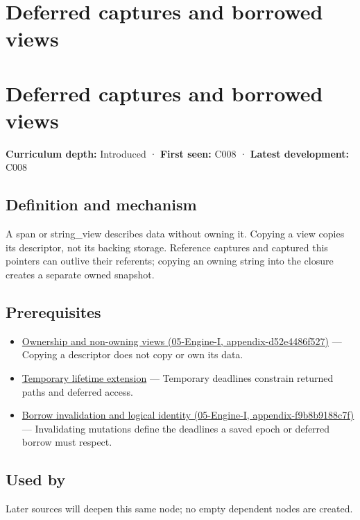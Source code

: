 \hypertarget{appendix-aea529eb5175}{}
\section*{Deferred captures and borrowed views}
\section{Deferred captures and borrowed views}\label{deferred-captures-and-borrowed-views}

\textbf{Curriculum depth:} Introduced · \textbf{First seen:} C008 · \textbf{Latest development:} C008

\subsection{Definition and mechanism}\label{definition-and-mechanism}

A span or string\_view describes data without owning it. Copying a view copies its descriptor, not its backing storage. Reference captures and captured this pointers can outlive their referents; copying an owning string into the closure creates a separate owned snapshot.

\subsection{Prerequisites}\label{prerequisites}

\begin{itemize}
\tightlist
\item
  \href{}{Ownership and non-owning views (05-Engine-I, appendix-d52e4486f527)} --- Copying a descriptor does not copy or own its data.
\item
  \hyperref[appendix-a978b29bbbb0]{Temporary lifetime extension} --- Temporary deadlines constrain returned paths and deferred access.
\item
  \href{}{Borrow invalidation and logical identity (05-Engine-I, appendix-f9b8b9188c7f)} --- Invalidating mutations define the deadlines a saved epoch or deferred borrow must respect.
\end{itemize}

\subsection{Used by}\label{used-by}

Later sources will deepen this same node; no empty dependent nodes are created.

